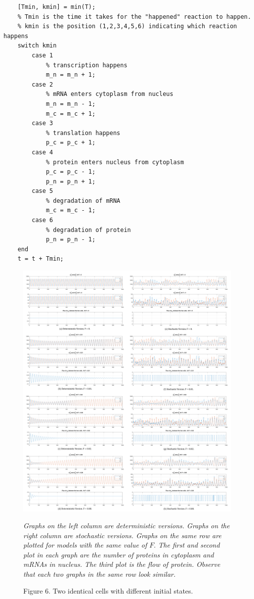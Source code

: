 \documentclass[12pt]{article}
\renewcommand{\(}{\left (}
\renewcommand{\)}{\right )}
\begin{document}
\begin{lstlisting}
    [Tmin, kmin] = min(T);
    % Tmin is the time it takes for the "happened" reaction to happen.
    % kmin is the position (1,2,3,4,5,6) indicating which reaction happens
    switch kmin
        case 1
            % transcription happens
            m_n = m_n + 1;
        case 2
            % mRNA enters cytoplasm from nucleus
            m_n = m_n - 1;
            m_c = m_c + 1;
        case 3
            % translation happens
            p_c = p_c + 1;
        case 4
            % protein enters nucleus from cytoplasm
            p_c = p_c - 1;
            p_n = p_n + 1;
        case 5
            % degradation of mRNA
            m_c = m_c - 1;
        case 6
            % degradation of protein
            p_n = p_n - 1;
    end
    t = t + Tmin;
\end{lstlisting}



\begin{figure}[!]
    \centering
	\begin{minipage}{0.99\textwidth}
		\centering
		\includegraphics[width=0.99\textwidth]{combined_results.png}
		\caption*{\small Figure 6. Two identical cells with different initial states.}
	\end{minipage}
	\footnotesize
	\emph{Graphs on the left column are deterministic versions. Graphs on the right column are stochastic versions. Graphs on the same row are plotted for models with the same value of $F.$ The first and second plot in each graph are the number of proteins in cytoplasm and mRNAs in nucleus. The third plot is the flow of protein. Observe that each two graphs in the same row look similar.}
\end{figure}
\end{document}
